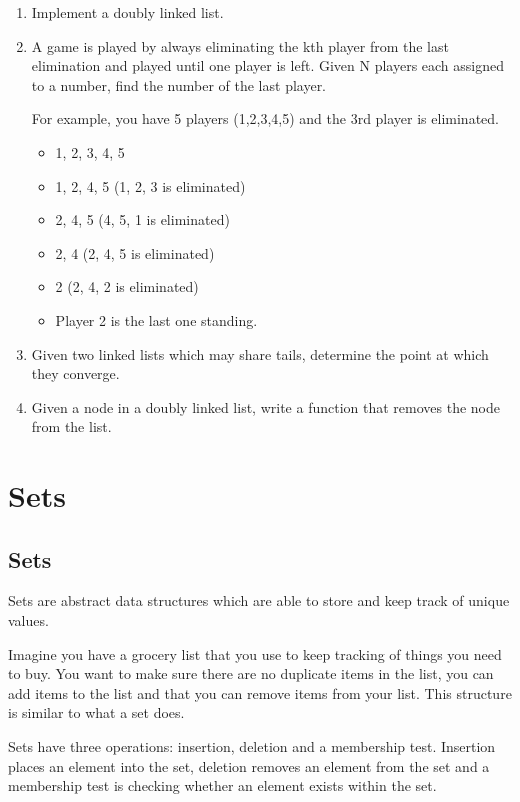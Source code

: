 \documentclass[11pt,oneside]{book}
\begin{document}
\begin{enumerate}
\item Implement a doubly linked list.
\item A game is played by always eliminating the kth player from the last elimination and played until one player is left. Given N players each assigned to a number, find the number of the last player.

For example, you have 5 players (1,2,3,4,5) and the 3rd player is eliminated.

\begin{itemize}
\item 1, 2, 3, 4, 5 
\item 1, 2, 4, 5 (1, 2, 3 is eliminated)
\item 2, 4, 5 (4, 5, 1 is eliminated)
\item 2, 4 (2, 4, 5 is eliminated)
\item 2 (2, 4, 2 is eliminated)
\item Player 2 is the last one standing.
\end{itemize}
\item Given two linked lists which may share tails, determine the point at which they converge.
\item Given a node in a doubly linked list, write a function that removes the node from the list. 
\end{enumerate}

    \chapter{ Sets }
        \section{ Sets }
        

Sets are abstract data structures which are able to store and keep track of unique values.

Imagine you have a grocery list that you use to keep tracking of things you need to buy. You want to make sure there are no duplicate items in the list, you can add items to the list and that you can remove items from your list. This structure is similar to what a set does.

Sets have three operations: insertion, deletion and a membership test. Insertion places an element into the set, deletion removes an element from the set and a membership test is checking whether an element exists within the set.
\end{document}
